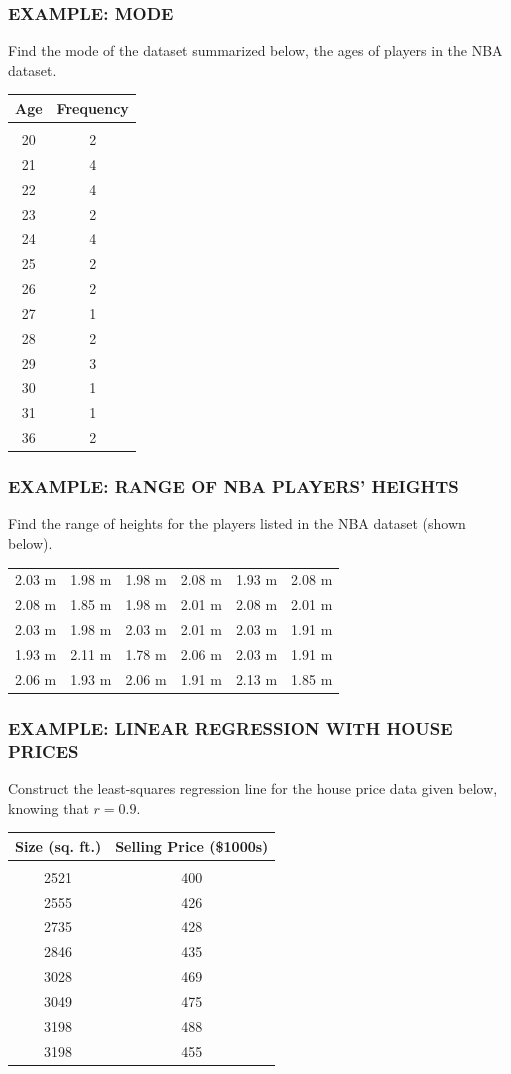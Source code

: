 \documentclass[8pt]{beamer}
\newcommand{\extitle}[1]{\frametitle{\fontfamily{fvs}\selectfont \small\color{black!70!blue!80!cyan}\uppercase{\bfseries Example: #1}}}
\def\solblank{\begin{tcolorbox}[colframe=black!50!blue!50!cyan,
colback=white,
bottomrule=0mm,
rightrule=0mm,
sharp corners=all] 
\vspace{6in}
\text{}
\end{tcolorbox}}
\begin{document}
\begin{frame}
\extitle{Mode}
Find the mode of the dataset summarized below, the ages of players in the NBA dataset.
\begin{center}
\begin{tabular}{c c}
\textbf{Age} & \textbf{Frequency}\\
\hline
& \\
20 & 2\\
21 & 4\\
22 & 4\\
23 & 2\\
24 & 4\\
25 & 2\\
26 & 2\\
27 & 1\\
28 & 2\\
29 & 3\\
30 & 1\\
31 & 1\\
36 & 2
\end{tabular}
\end{center}
\end{frame}

\begin{frame}
\extitle{Range of NBA Players' Heights}
Find the range of heights for the players listed in the NBA dataset (shown below).
\begin{center}
\begin{tabular}{c c c c c c}
2.03 m & 1.98 m & 1.98 m & 2.08 m & 1.93 m & 2.08 m\\
2.08 m & 1.85 m & 1.98 m & 2.01 m & 2.08 m & 2.01 m\\
2.03 m & 1.98 m & 2.03 m & 2.01 m & 2.03 m & 1.91 m\\
1.93 m & 2.11 m & 1.78 m & 2.06 m & 2.03 m & 1.91 m\\
2.06 m & 1.93 m & 2.06 m & 1.91 m & 2.13 m & 1.85 m
\end{tabular}
\end{center}

\solblank
\end{frame}

\begin{frame}
\extitle{Linear Regression with House Prices}
Construct the least-squares regression line for the house price data given below, knowing that $r=0.9$.
\begin{center}
\begin{tabular}{c c}
\textbf{Size (sq. ft.)} & \textbf{Selling Price (\$1000s)}\\
\hline
& \\
2521 & 400\\
2555 & 426\\
2735 & 428\\
2846 & 435\\
3028 & 469\\
3049 & 475\\
3198 & 488\\
3198 & 455\\
\end{tabular}
\end{center}
\end{frame}
\end{document}
